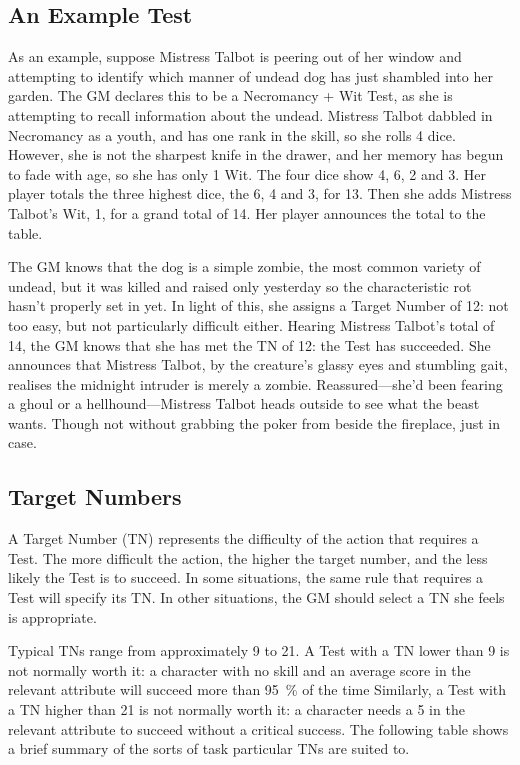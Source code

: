 \subsection{An Example Test}

As an example, suppose Mistress Talbot is peering out of her window and attempting to identify which manner of undead dog has just shambled into her garden.
The GM declares this to be a Necromancy + Wit Test, as she is attempting to recall information about the undead.
Mistress Talbot dabbled in Necromancy as a youth, and has one rank in the skill, so she rolls 4 dice.
However, she is not the sharpest knife in the drawer, and her memory has begun to fade with age, so she has only 1 Wit.
The four dice show 4, 6, 2 and 3.
Her player totals the three highest dice, the 6, 4 and 3, for 13.
Then she adds Mistress Talbot's Wit, 1, for a grand total of 14.
Her player announces the total to the table.

The GM knows that the dog is a simple zombie, the most common variety of undead, but it was killed and raised only yesterday so the characteristic rot hasn't properly set in yet.
In light of this, she assigns a Target Number of 12: not too easy, but not particularly difficult either.
Hearing Mistress Talbot's total of 14, the GM knows that she has met the TN of 12: the Test has succeeded.
She announces that Mistress Talbot, by the creature's glassy eyes and stumbling gait, realises the midnight intruder is merely a zombie.
Reassured---she'd been fearing a ghoul or a hellhound---Mistress Talbot heads outside to see what the beast wants.
Though not without grabbing the poker from beside the fireplace, just in case.

\subsection{Target Numbers}

A Target Number (TN) represents the difficulty of the action that requires a Test.
The more difficult the action, the higher the target number, and the less likely the Test is to succeed.
In some situations, the same rule that requires a Test will specify its TN.
In other situations, the GM should select a TN she feels is appropriate.

Typical TNs range from approximately 9 to 21.
A Test with a TN lower than 9 is not normally worth it: a character with no skill and an average score in the relevant attribute will succeed more than \SI{95}{\percent} of the time
Similarly, a Test with a TN higher than 21 is not normally worth it: a character needs a 5 in the relevant attribute to succeed without a critical success.
The following table shows a brief summary of the sorts of task particular TNs are suited to.

